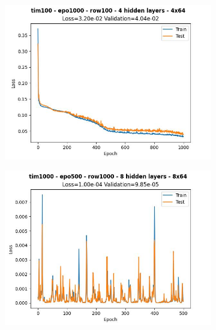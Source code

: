 \begin{figure}[H]
    \centering
    \begin{subfigure}{.47\linewidth}
        \centering
        \includegraphics[width=\textwidth]{other-models/2024-05-20T20:51:57.519322_pendulum_tim100_epo1000_row100.jpg}
    \end{subfigure}
    \begin{subfigure}{.47\linewidth}
        \centering
        \includegraphics[width=\textwidth]{other-models/2024-05-20T22:20:08.549219_pendulum_tim1000_epo500_row1000.jpg}
    \end{subfigure}
    \begin{subfigure}{.47\linewidth}
        \centering

\end{subfigure}
\end{figure}
